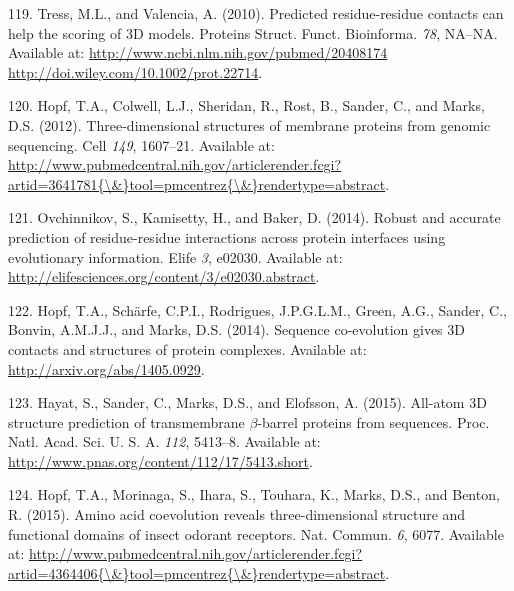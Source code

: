 \documentclass[11pt,a4paper,twoside]{book}
\theoremstyle{definition}
\theoremstyle{definition}
\theoremstyle{remark}
\begin{document}
\hypertarget{ref-Tress2010}{}
119. Tress, M.L., and Valencia, A. (2010). Predicted residue-residue
contacts can help the scoring of 3D models. Proteins Struct. Funct.
Bioinforma. \emph{78}, NA--NA. Available at:
\href{http://www.ncbi.nlm.nih.gov/pubmed/20408174\%20http://doi.wiley.com/10.1002/prot.22714}{http://www.ncbi.nlm.nih.gov/pubmed/20408174 http://doi.wiley.com/10.1002/prot.22714}.

\hypertarget{ref-Hopf2012}{}
120. Hopf, T.A., Colwell, L.J., Sheridan, R., Rost, B., Sander, C., and
Marks, D.S. (2012). Three-dimensional structures of membrane proteins
from genomic sequencing. Cell \emph{149}, 1607--21. Available at:
\href{http://www.pubmedcentral.nih.gov/articlerender.fcgi?artid=3641781\%7B/\&\%7Dtool=pmcentrez\%7B/\&\%7Drendertype=abstract}{http://www.pubmedcentral.nih.gov/articlerender.fcgi?artid=3641781\{\textbackslash{}\&\}tool=pmcentrez\{\textbackslash{}\&\}rendertype=abstract}.

\hypertarget{ref-Ovchinnikov2014a}{}
121. Ovchinnikov, S., Kamisetty, H., and Baker, D. (2014). Robust and
accurate prediction of residue-residue interactions across protein
interfaces using evolutionary information. Elife \emph{3}, e02030.
Available at: \url{http://elifesciences.org/content/3/e02030.abstract}.

\hypertarget{ref-Hopf2014}{}
122. Hopf, T.A., Schärfe, C.P.I., Rodrigues, J.P.G.L.M., Green, A.G.,
Sander, C., Bonvin, A.M.J.J., and Marks, D.S. (2014). Sequence
co-evolution gives 3D contacts and structures of protein complexes.
Available at: \url{http://arxiv.org/abs/1405.0929}.

\hypertarget{ref-Hayat2015a}{}
123. Hayat, S., Sander, C., Marks, D.S., and Elofsson, A. (2015).
All-atom 3D structure prediction of transmembrane \(\beta\)-barrel
proteins from sequences. Proc. Natl. Acad. Sci. U. S. A. \emph{112},
5413--8. Available at:
\url{http://www.pnas.org/content/112/17/5413.short}.

\hypertarget{ref-Hopf2015a}{}
124. Hopf, T.A., Morinaga, S., Ihara, S., Touhara, K., Marks, D.S., and
Benton, R. (2015). Amino acid coevolution reveals three-dimensional
structure and functional domains of insect odorant receptors. Nat.
Commun. \emph{6}, 6077. Available at:
\href{http://www.pubmedcentral.nih.gov/articlerender.fcgi?artid=4364406\%7B/\&\%7Dtool=pmcentrez\%7B/\&\%7Drendertype=abstract}{http://www.pubmedcentral.nih.gov/articlerender.fcgi?artid=4364406\{\textbackslash{}\&\}tool=pmcentrez\{\textbackslash{}\&\}rendertype=abstract}.
\end{document}
